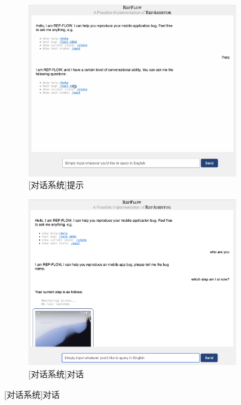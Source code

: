 \begin{figure}[H]
    \centering
    \begin{subfigure}{0.45\textwidth}{
        \includegraphics[width=\linewidth]{figures/cmd.png}
        \caption{[对话系统]提示}\label{fig:cmd}
    }
    \end{subfigure}
    \begin{subfigure}{0.465\textwidth}{
        \includegraphics[width=\linewidth]{figures/chat.png}
        \caption{[对话系统]对话}\label{fig:chat}
    }
    \end{subfigure}
\end{figure}



